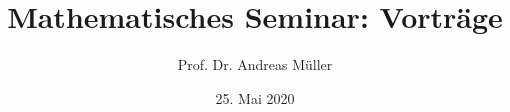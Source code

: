 %
%
%


\beamertemplatenavigationsymbolsempty
\title[MathSem]{Mathematisches Seminar: Vorträge}
\author[A.~Müller]{Prof. Dr. Andreas Müller}
\date[]{25. Mai 2020}

